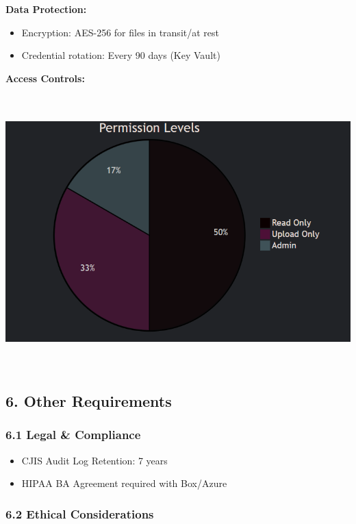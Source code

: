 \documentclass[
]{article}
\providecommand{\tightlist}{%
  \setlength{\itemsep}{0pt}\setlength{\parskip}{0pt}}
\begin{document}
\textbf{Data Protection:}

\begin{itemize}
\tightlist
\item
  Encryption: AES-256 for files in transit/at rest
\item
  Credential rotation: Every 90 days (Key Vault)
\end{itemize}

\textbf{Access Controls:}

\includegraphics[width=6.5in,height=4.15208in]{image3.png}

\hypertarget{other-requirements}{%
\subsection{\texorpdfstring{\textbf{6. Other
Requirements}}{6. Other Requirements}}\label{other-requirements}}

\hypertarget{legal-compliance}{%
\subsubsection{\texorpdfstring{\textbf{6.1 Legal \&
Compliance}}{6.1 Legal \& Compliance}}\label{legal-compliance}}

\begin{itemize}
\tightlist
\item
  CJIS Audit Log Retention: 7 years
\item
  HIPAA BA Agreement required with Box/Azure
\end{itemize}

\hypertarget{ethical-considerations}{%
\subsubsection{\texorpdfstring{\textbf{6.2 Ethical
Considerations}}{6.2 Ethical Considerations}}\label{ethical-considerations}}
\end{document}
